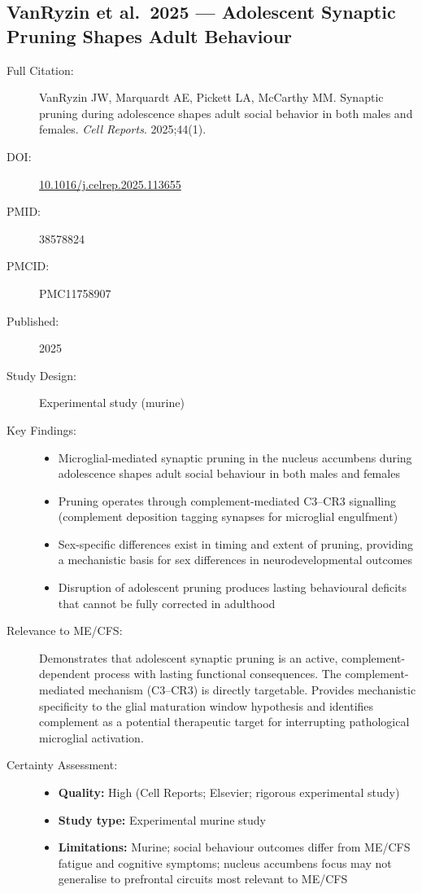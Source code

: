 \subsection{VanRyzin et al.\ 2025 --- Adolescent Synaptic Pruning Shapes Adult Behaviour}

\begin{description}
    \item[Full Citation:] VanRyzin JW, Marquardt AE, Pickett LA, McCarthy MM. Synaptic pruning during adolescence shapes adult social behavior in both males and females. \textit{Cell Reports}. 2025;44(1).
    \item[DOI:] \href{https://doi.org/10.1016/j.celrep.2025.113655}{10.1016/j.celrep.2025.113655}
    \item[PMID:] 38578824
    \item[PMCID:] PMC11758907
    \item[Published:] 2025
    \item[Study Design:] Experimental study (murine)
    \item[Key Findings:]
    \begin{itemize}
        \item Microglial-mediated synaptic pruning in the nucleus accumbens during adolescence shapes adult social behaviour in both males and females
        \item Pruning operates through complement-mediated C3--CR3 signalling (complement deposition tagging synapses for microglial engulfment)
        \item Sex-specific differences exist in timing and extent of pruning, providing a mechanistic basis for sex differences in neurodevelopmental outcomes
        \item Disruption of adolescent pruning produces lasting behavioural deficits that cannot be fully corrected in adulthood
    \end{itemize}
    \item[Relevance to ME/CFS:] Demonstrates that adolescent synaptic pruning is an active, complement-dependent process with lasting functional consequences. The complement-mediated mechanism (C3--CR3) is directly targetable. Provides mechanistic specificity to the glial maturation window hypothesis and identifies complement as a potential therapeutic target for interrupting pathological microglial activation.
    \item[Certainty Assessment:]
    \begin{itemize}
        \item \textbf{Quality:} High (Cell Reports; Elsevier; rigorous experimental study)
        \item \textbf{Study type:} Experimental murine study
        \item \textbf{Limitations:} Murine; social behaviour outcomes differ from ME/CFS fatigue and cognitive symptoms; nucleus accumbens focus may not generalise to prefrontal circuits most relevant to ME/CFS
    \end{itemize}
\end{description}

